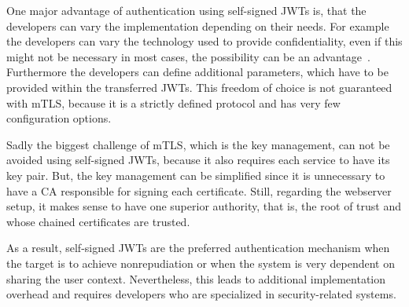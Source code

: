 One major advantage of authentication using self-signed JWTs is, that the developers can vary the implementation depending on their needs.
For example the developers can vary the technology used to provide confidentiality, even if this might not be necessary in most cases, the possibility can be an advantage~\cite{dias2020microservices}.
Furthermore the developers can define additional parameters, which have to be provided within the transferred JWTs.
This freedom of choice is not guaranteed with mTLS, because it is a strictly defined protocol and has very few configuration options.


Sadly the biggest challenge of mTLS, which is the key management, can not be avoided using self-signed JWTs, because it also requires each service to have its key pair.
But, the key management can be simplified since it is unnecessary to have a CA responsible for signing each certificate.
Still, regarding the webserver setup, it makes sense to have one superior authority, that is, the root of trust and whose chained certificates are trusted.

As a result, self-signed JWTs are the preferred authentication mechanism when the target is to achieve nonrepudiation or when the system is very dependent on sharing the user context.
Nevertheless, this leads to additional implementation overhead and requires developers who are specialized in security-related systems.
